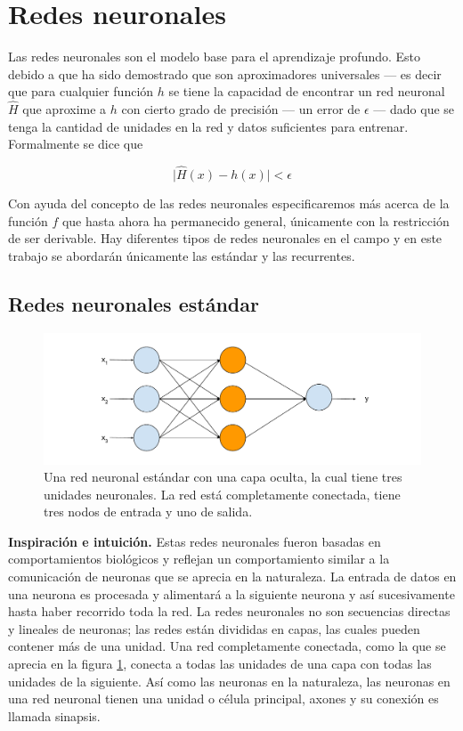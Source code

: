 \section{Redes neuronales}

Las redes neuronales son el modelo base para el aprendizaje profundo. Esto debido a que ha sido demostrado que son aproximadores universales \parencite{hornik1989universal} --- es decir que para cualquier función $h$ se tiene la capacidad de encontrar un red neuronal $\hat{H}$ que aproxime a $h$ con cierto grado de precisión --- un error de $\epsilon$ --- dado que se tenga la cantidad de unidades en la red y datos suficientes para entrenar. Formalmente se dice que

\begin{equation}
\label{eq:universaltheorem}
\vert \hat{H}(x) - h(x) \vert < \epsilon
\end{equation}

Con ayuda del concepto de las redes neuronales especificaremos más acerca de la función $f$ que hasta ahora ha permanecido general, únicamente con la restricción de ser derivable. Hay diferentes tipos de redes neuronales en el campo y en este trabajo se abordarán únicamente las estándar y las recurrentes.

\subsection{Redes neuronales estándar}

\begin{figure}
	\includegraphics[scale=.6]{Figures/standardnn.pdf}
	\caption{Una red neuronal estándar con una capa oculta, la cual tiene tres unidades neuronales. La red está completamente conectada, tiene tres nodos de entrada y uno de salida.}
	\label{fig:standardnn}
\end{figure}

\textbf{Inspiración e intuición.} Estas redes neuronales fueron basadas en comportamientos biológicos y reflejan un comportamiento similar a la comunicación de neuronas que se aprecia en la naturaleza. La entrada de datos en una neurona es procesada y alimentará a la siguiente neurona y así sucesivamente hasta haber recorrido toda la red. La redes neuronales no son secuencias directas y lineales de neuronas; las redes están divididas en capas, las cuales pueden contener más de una unidad. Una red completamente conectada, como la que se aprecia en la figura \ref{fig:standardnn}, conecta a todas las unidades de una capa con todas las unidades de la siguiente. Así como las neuronas en la naturaleza, las neuronas en una red neuronal tienen una unidad o célula principal, axones y su conexión es llamada sinapsis.

